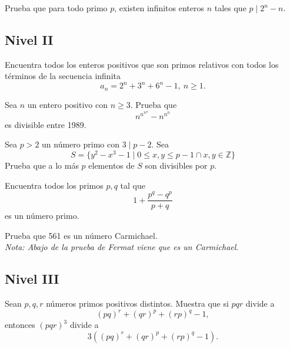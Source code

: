 \documentclass[11pt]{scrartcl}
\newcommand{\thmdifficulty}{0}
\newcommand{\problemdiff}[1]{\renewcommand{\thmdifficulty}{#1}}
\begin{document}
\problemdiff{3}
\begin{problem}
    Prueba que para todo primo $p$, existen infinitos enteros $n$ tales que $p \mid 2^{n}-n$.
\end{problem}

\subsection{Nivel II}

\problemdiff{4}
\begin{problem}
    
    Encuentra todos los enteros positivos que son primos relativos con todos los términos de la secuencia infinita \[ a_n=2^n+3^n+6^n -1,\ n\geq 1. \]
    
\end{problem}


\problemdiff{4}
\begin{problem}
    Sea $n$ un entero positivo con $n\geq 3$. Prueba que 
    \[n^{n^{n^{n}}}-n^{n^{n}}\]
    es divisible entre 1989.
\end{problem}


\problemdiff{4}
\begin{problem}
    Sea $p>2$ un número primo con $3 \mid p-2$. Sea
    \[S=\{y^2-x^3-1 \mid 0 \leq x ,y \leq p-1 \cap x,y \in \mathbb{Z}\}\]
    Prueba que a lo más $p$ elementos de $S$ son divisibles por $p$.
\end{problem}

\problemdiff{4}
\begin{problem}
    Encuentra todos los primos $p,q$ tal que
    \[1+\frac{p^q-q^p}{p+q}\]
    es un número primo.
\end{problem}

\problemdiff{4}
\begin{problem}
    Prueba que 561 es un número Carmichael. \\ 
    \textit{Nota: Abajo de la prueba de Fermat viene que es un Carmichael}.
\end{problem}

\subsection{Nivel III}
\problemdiff{5}
\begin{problem}

    Sean $p, q, r$ números primos positivos distintos. Muestra que si $pqr$ divide a
\[(pq)^r+(qr)^p+(rp)^q-1,\]
entonces $(pqr)^3$ divide a
\[3((pq)^r+(qr)^p+(rp)^q-1).\]
\end{problem}
\end{document}
